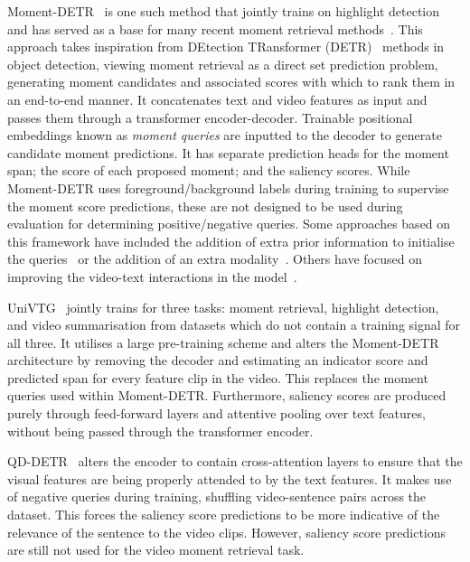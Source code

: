 Moment-DETR~\cite{lei2021qvhl} is one such method that jointly trains on highlight detection and has served as a base for many recent moment retrieval methods~\cite{liu2022umt, moon2023query, moon2024cgdetr, lin2023univtg, jang2023knowing, lee2023bamdetr, xu2023mh, sun2024tr, liu2024r, xiao2024bridging}. %
This approach takes inspiration from DEtection TRansformer (DETR)~\cite{carion2020detr} methods in object detection, viewing moment retrieval as a direct set prediction problem, generating moment candidates and associated scores with which to rank them in an end-to-end manner. It concatenates text and video features as input and passes them through a transformer encoder-decoder. Trainable positional embeddings known as \textit{moment queries} are inputted to the decoder to generate candidate moment predictions. It has separate prediction heads for the moment span; the score of each proposed moment; and the saliency scores. While Moment-DETR uses foreground/background labels during training to supervise the moment score predictions, these are not designed to be used during evaluation for determining positive/negative queries.
Some approaches based on this framework have included the addition of extra prior information to initialise the queries~\cite{jang2023knowing} or the addition of an extra modality~\cite{liu2022umt}. Others have focused on improving the video-text interactions in the model~\cite{moon2023query, moon2024cgdetr}.%

UniVTG~\cite{lin2023univtg} jointly trains for three tasks: moment retrieval, highlight detection, and video summarisation from datasets which do not contain a training signal for all three. It utilises a large pre-training scheme and alters the Moment-DETR architecture by removing the decoder and estimating an indicator score and predicted span for every feature clip in the video. This replaces the moment queries used within Moment-DETR.  
Furthermore, saliency scores are produced purely through feed-forward layers and attentive pooling over text features, without being passed through the transformer encoder.

QD-DETR~\cite{moon2023query} alters the encoder to contain cross-attention layers to ensure that the visual features are being properly attended to by the text features. It makes use of negative queries during training, shuffling video-sentence pairs across the dataset. This forces the saliency score predictions to be more indicative of the relevance of the sentence to the video clips.
However, saliency score predictions are still not used for the video moment retrieval task.

